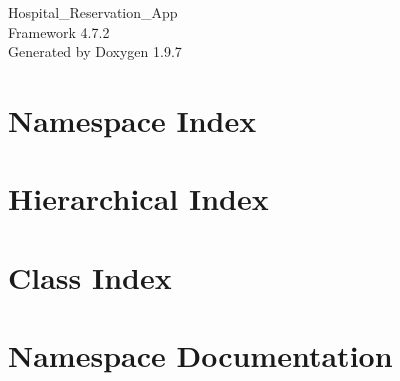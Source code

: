 \documentclass[twoside]{book}
\newcommand{\+}{\discretionary{\mbox{\scriptsize$\hookleftarrow$}}{}{}}
\newcommand{\clearemptydoublepage}{%
    \newpage{\pagestyle{empty}\cleardoublepage}%
  }
\begin{document}
  \raggedbottom
    \hypersetup{pageanchor=false,
                bookmarksnumbered=true,
                pdfencoding=unicode
               }
  \begin{titlepage}
  \vspace*{7cm}
  \begin{center}%
  {\Large Hospital\+\_\+\+Reservation\+\_\+\+App}\\
  [1ex]\large Framework 4.\+7.\+2 \\
  \vspace*{1cm}
  {\large Generated by Doxygen 1.9.7}\\
  \end{center}
  \end{titlepage}
  \clearemptydoublepage
  \tableofcontents
  \clearemptydoublepage
  \hypersetup{pageanchor=true}

\chapter{Namespace Index}

\chapter{Hierarchical Index}

\chapter{Class Index}

\chapter{Namespace Documentation}








\end{document}
